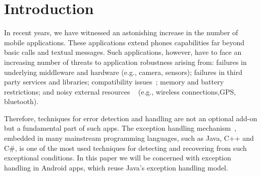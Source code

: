 \documentclass[conference]{IEEEtran}
\begin{document}





\section{Introduction}

In recent years, we have witnessed an astonishing increase in the number of
mobile applications. These applications extend phones capabilities 
far beyond basic calls and textual messages. Such applications, however,
have to face an increasing number of threats to application robustness
 arising from: failures in underlying middleware and hardware (e.g., camera, sensors);
failures in third party services and libraries; compatibility issues~\cite{McDon13}; 
 memory and battery restrictions; and noisy external resources ~\cite{Zhang12} (e.g., wireless connections,GPS, bluetooth). 

Therefore, techniques for error detection and handling are not  an optional add-on but a 
fundamental part of such apps. The exception handling mechanism~\cite{goodenough1975exception},
embedded in many mainstream programming languages, such as Java, C++ and C\#,
 is one of the most used techniques for detecting and recovering from such exceptional conditions.
In this paper we will be concerned with exception handling in Android apps,
which reuse Java's exception handling model.
 
\end{document}
